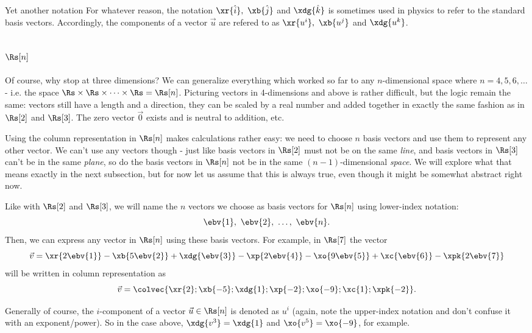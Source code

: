\begin{note}{Yet another notation \shrug}{}
  For whatever reason, the notation $\xr{\hat{i}},\ \xb{\hat{j}}$ and $\xdg{\hat{k}}$ is sometimes used in physics to refer to the standard basis vectors. Accordingly, the components of a vector $\vec{u}$ are refered to as $\xr{u^{i}},\ \xb{u^{j}}$ and $\xdg{u^{k}}$.
\end{note}

\subsection{$\Rs[n]$}
Of course, why stop at three dimensions? We can generalize everything which worked so far to any $n$-dimensional space where $n=4,5,6,\dots$ - i.e. the space $\Rs\times\Rs\times\cdots\times\Rs=\Rs[n]$. Picturing vectors in 4-dimensions and above is rather difficult, but the logic remain the same: vectors still have a length and a direction, they can be scaled by a real number and added together in exactly the same fashion as in $\Rs[2]$ and $\Rs[3]$. The zero vector $\vec{0}$ exists and is neutral to addition, etc.

Using the column representation in $\Rs[n]$ makes calculations rather easy: we need to choose $n$ basis vectors and use them to represent any other vector. We can't use any vectors though - just like basis vectors in $\Rs[2]$ must not be on the same \textit{line}, and basis vectors in $\Rs[3]$ can't be in the same \textit{plane}, so do the basis vectors in $\Rs[n]$ not be in the same $\left(n-1\right)$-dimensional \textit{space}. We will explore what that means exactly in the next subsection, but for now let us assume that this is always true, even though it might be somewhat abstract right now.

Like with $\Rs[2]$ and $\Rs[3]$, we will name the $n$ vectors we choose as basis vectors for $\Rs[n]$ using lower-index notation:
\[
  \ebv{1},\ \ebv{2},\ \dots,\ \ebv{n}.
\]
Then, we can express any vector in $\Rs[n]$ using these basis vectors. For example, in $\Rs[7]$ the vector
\[
  \vec{v} = \xr{2\ebv{1}}-\xb{5\ebv{2}}+\xdg{\ebv{3}}-\xp{2\ebv{4}}-\xo{9\ebv{5}}+\xc{\ebv{6}}-\xpk{2\ebv{7}}
\]
will be written in column representation as
\[
  \vec{v} = \colvec{\xr{2};\xb{-5};\xdg{1};\xp{-2};\xo{-9};\xc{1};\xpk{-2}}.
\]

Generally of course, the $i$-component of a vector $\vec{u}\in\Rs[n]$ is denoted as $u^{i}$ (again, note the upper-index notation and don't confuse it with an exponent/power). So in the case above, $\xdg{v^{3}}=\xdg{1}$ and $\xo{v^{5}}=\xo{-9}$, for example.

